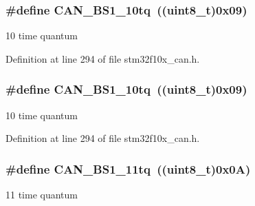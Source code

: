 \subsubsection[{\texorpdfstring{C\+A\+N\+\_\+\+B\+S1\+\_\+10tq}{CAN_BS1_10tq}}]{\setlength{\rightskip}{0pt plus 5cm}\#define C\+A\+N\+\_\+\+B\+S1\+\_\+10tq~(({\bf uint8\+\_\+t})0x09)}\hypertarget{group___c_a_n__time__quantum__in__bit__segment__1_gaf1b474aa632787e70bedd0c5dfdbf5ed}{}\label{group___c_a_n__time__quantum__in__bit__segment__1_gaf1b474aa632787e70bedd0c5dfdbf5ed}
10 time quantum 

Definition at line 294 of file stm32f10x\+\_\+can.\+h.

\subsubsection[{\texorpdfstring{C\+A\+N\+\_\+\+B\+S1\+\_\+10tq}{CAN_BS1_10tq}}]{\setlength{\rightskip}{0pt plus 5cm}\#define C\+A\+N\+\_\+\+B\+S1\+\_\+10tq~(({\bf uint8\+\_\+t})0x09)}\hypertarget{group___c_a_n__time__quantum__in__bit__segment__1_gaf1b474aa632787e70bedd0c5dfdbf5ed}{}\label{group___c_a_n__time__quantum__in__bit__segment__1_gaf1b474aa632787e70bedd0c5dfdbf5ed}
10 time quantum 

Definition at line 294 of file stm32f10x\+\_\+can.\+h.

\subsubsection[{\texorpdfstring{C\+A\+N\+\_\+\+B\+S1\+\_\+11tq}{CAN_BS1_11tq}}]{\setlength{\rightskip}{0pt plus 5cm}\#define C\+A\+N\+\_\+\+B\+S1\+\_\+11tq~(({\bf uint8\+\_\+t})0x0\+A)}\hypertarget{group___c_a_n__time__quantum__in__bit__segment__1_ga4f765ffbe7fda4fb6d0fde7bc4058a14}{}\label{group___c_a_n__time__quantum__in__bit__segment__1_ga4f765ffbe7fda4fb6d0fde7bc4058a14}
11 time quantum 

